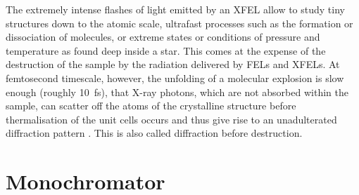 \documentclass[
twoside,
openright,
titlepage,
numbers=noenddot,
headinclude,
fleqn,
a4paper,
footinclude=true,
cleardoublepage=empty,
abstractoff,
BCOR=5mm,
paper=a4,
fontsize=11pt,
british,ngerman,american,
]{scrreprt}
\begin{document}
The extremely intense flashes of light emitted by an \ac{XFEL} allow
to study tiny structures down to the atomic scale, ultrafast processes
such as the formation or dissociation of molecules, or extreme states
or conditions of pressure and temperature as found deep inside a star.
This comes at the expense of the destruction of the sample by the
radiation delivered by \acp{FEL} and \acp{XFEL}.   At femtosecond
timescale, however, the unfolding of a molecular explosion is slow
enough (roughly \SI{10}{fs}), that X-ray photons, which are not
absorbed within the sample, can scatter off the atoms of the
crystalline structure before thermalisation of the unit cells occurs
and thus give rise to an unadulterated diffraction pattern
\cite{Neutze2000,Chapman2011}.  This is also called diffraction before
destruction.



\section{Monochromator}
\label{sec:optics}
\end{document}
